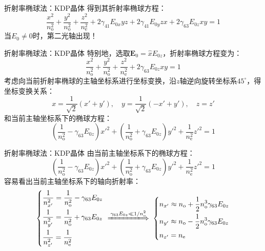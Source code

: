 \documentclass{beamer}
\renewcommand{\bm}{\symbf}
\newenvironment{slide}{
    \begin{frame}{\bfseries{\sectiontitle}}
}{
    \end{frame}
}
\begin{document}
\begin{slide}{折射率椭球法：KDP晶体}
    得到其折射率椭球方程：
    \[
    \frac{x^2}{n_{\mathrm{o}}^2} + \frac{y^2}{n_{\mathrm{o}}^2} + \frac{z^2}{n_{\mathrm{e}}^2} + 2\gamma_{41}E_{0x}yz + 2\gamma_{41}E_{0y}zx + 2\gamma_{63}E_{0z}xy = 1
    \]
    当$E_0\neq0$时，第二光轴出现！
\end{slide}

\begin{slide}{折射率椭球法：KDP晶体}
    特别地，选取$\bm{E}_0=\hat{x}E_{0z}$，折射率椭球方程变为：
    \[
    \frac{x^2}{n_{\mathrm{o}}^2} + \frac{y^2}{n_{\mathrm{o}}^2} + \frac{z^2}{n_{\mathrm{e}}^2} + 2\gamma_{63}E_{0z}xy = 1
    \]
    考虑向当前折射率椭球的主轴坐标系进行坐标变换，沿$z$轴逆向旋转坐标系$45^\circ$，得坐标变换关系：
    \[
        x = \frac{1}{\sqrt{2}}(x' + y'),\quad
        y = \frac{1}{\sqrt{2}}(-x' + y'),\quad
        z = z'
    \]
    和当前主轴坐标系下的椭球方程：
    \[
        \left(\frac{1}{n_{\mathrm{o}}^2} - \gamma_{63}E_{0z}\right)x'^2 + \left(\frac{1}{n_{\mathrm{o}}^2} + \gamma_{63}E_{0z}\right)y'^2 + \frac{1}{n_{\mathrm{e}}^2}z'^2 = 1
    \]
\end{slide}

\begin{slide}{折射率椭球法：KDP晶体}
    由当前主轴坐标系下的椭球方程：
    \[
        \left(\frac{1}{n_{\mathrm{o}}^2} - \gamma_{63}E_{0z}\right)x'^2 + \left(\frac{1}{n_{\mathrm{o}}^2} + \gamma_{63}E_{0z}\right)y'^2 + \frac{1}{n_{\mathrm{e}}^2}z'^2 = 1
    \]
    容易看出当前主轴坐标系下的轴向折射率：
    \[
        \left\{
        \begin{aligned}
            &\frac{1}{n_{x'}^2} = \frac{1}{n_{\mathrm{o}}^2} - \gamma_{63}E_{0z} \\
            &\frac{1}{n_{y'}^2} = \frac{1}{n_{\mathrm{o}}^2} + \gamma_{63}E_{0z} \\
            &\frac{1}{n_{z'}^2} = \frac{1}{n_{\mathrm{e}}^2} \\
        \end{aligned}
        \right.
        \;\xLongrightarrow{\gamma_{63}E_{0z} \ll 1/n_{\mathrm{o}}^2}\;
        \left\{
        \begin{aligned}
            &n_{x'} \approx n_{\mathrm{o}} + \frac{1}{2}n_{\mathrm{o}}^3\gamma_{63}E_{0z} \\
            &n_{y'} \approx n_{\mathrm{o}} - \frac{1}{2}n_{\mathrm{o}}^3\gamma_{63}E_{0z} \\
            &n_{z'} = n_{\mathrm{e}}
        \end{aligned}
        \right.
    \]
\end{slide}
\end{document}

